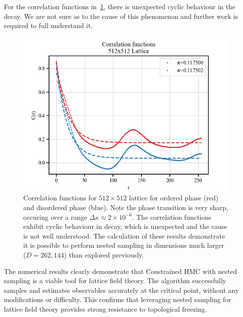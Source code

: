\documentclass[11pt]{article}
\begin{document}
    For the correlation functions in~\cref{fig:correlation_func_512}, there is unexpected cyclic behaviour in the decay.
    We are not sure as to the cause of this phenomenon and further work is required to full understand it.
    \begin{figure}[h!]
        \center
        \includegraphics[width=\linewidth]{../figures/CorrelationFunction512}
        \caption{
            Correlation functions for $512 \times 512$ lattice for ordered phase (red) and disordered
            phase (blue).
            Note the phase transition is very sharp, occuring over a range $\Delta \kappa \approx 2 \times 10^{-6}$.
            The correlation functions exhibit cyclic behaviour in decay, which is unexpected and the
            cause is not well understood.
            The calculation of these results demonstrate it is possible to perform nested sampling in dimensions much
            larger ($D=262,144$) than explored previously.
        }\label{fig:correlation_func_512}
    \end{figure}

    The numerical results clearly demonstrate that Constrained HMC with nested sampling is a viable tool for
    lattice field theory.
    The algorithm successfully samples and estimates observables accurately at the critical point, without any
    modifications or difficulty.
    This confirms that leveraging nested sampling for lattice field theory provides strong resistance to topological freezing.
\end{document}
